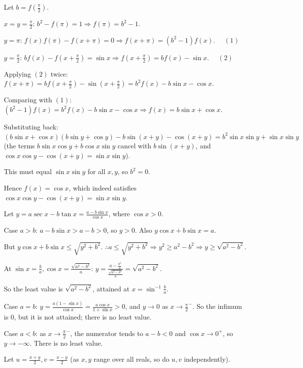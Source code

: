   Let $b = f\left(\frac{\pi}{2}\right)$.

  $x = y = \frac{\pi}{2}$: $b^2 - f(\pi) = 1\Rightarrow f(\pi) = b^2 - 1$.

  $y = \pi$: $f(x)f(\pi) - f(x + \pi) = 0\Rightarrow f(x + \pi) = (b^2 - 1)f(x)$. $\quad (1)$

  $y = \frac{\pi}{2}$: $bf(x) - f\left(x + \frac{\pi}{2}\right) = \sin x\Rightarrow f\left(x + \frac{\pi}{2}\right) =
  bf(x) - \sin x$. $\quad (2)$

  Applying $(2)$ twice: $f(x + \pi) = bf\left(x + \frac{\pi}{2}\right) - \sin\left(x + \frac{\pi}{2}\right) =
  b^2f(x) - b\sin x - \cos x$.

  Comparing with $(1)$: $(b^2 - 1)f(x) = b^2f(x) - b\sin x - \cos x\Rightarrow f(x) = b\sin x + \cos x$.

  Substituting back: $(b\sin x + \cos x)(b\sin y + \cos y) - b\sin(x + y) - \cos(x + y) = b^2\sin x\sin y + \sin x\sin
  y$ (the terms $b\sin x\cos y + b\cos x\sin y$ cancel with $b\sin(x + y)$, and $\cos x\cos y - \cos(x + y) = \sin
  x\sin y$).

  This must equal $\sin x\sin y$ for all $x, y$, so $b^2 = 0$.

  Hence $f(x) = \cos x$, which indeed satisfies $\cos x\cos y - \cos(x + y) = \sin x\sin y$.
\item Let $y = a\sec x - b\tan x = \frac{a - b\sin x}{\cos x}$, where $\cos x > 0$.

  Case $a > b$: $a - b\sin x > a - b > 0$, so $y > 0$. Also $y\cos x + b\sin x = a$.

  But $y\cos x + b\sin x\le\sqrt{y^2 + b^2}$. $\therefore a\le\sqrt{y^2 + b^2}\Rightarrow y^2\ge a^2 - b^2\Rightarrow
  y\ge\sqrt{a^2 - b^2}$.

  At $\sin x = \frac{b}{a}, \cos x = \frac{\sqrt{a^2 - b^2}}{a}$: $y = \frac{a - \frac{b^2}{a}}{\frac{\sqrt{a^2 -
  b^2}}{a}} = \sqrt{a^2 - b^2}$.

  So the least value is $\sqrt{a^2 - b^2}$, attained at $x = \sin^{-1}\frac{b}{a}$.

  Case $a = b$: $y = \frac{a(1 - \sin x)}{\cos x} = \frac{a\cos x}{1 + \sin x} > 0$, and $y\rightarrow 0$ as
  $x\rightarrow\frac{\pi}{2}^-$. So the infimum is $0$, but it is not attained; there is no least value.

  Case $a < b$: as $x\rightarrow\frac{\pi}{2}^-$, the numerator tends to $a - b < 0$ and $\cos x\rightarrow 0^+$, so
  $y\rightarrow -\infty$. There is no least value.
\item Let $u = \frac{x + y}{2}, v = \frac{x - y}{2}$ (as $x, y$ range over all reals, so do $u, v$ independently).

